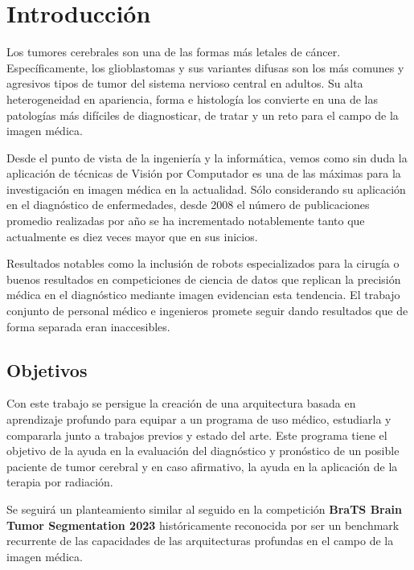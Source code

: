 \chapter{Introducción}

Los tumores cerebrales son una de las formas más letales de cáncer. Específicamente, los glioblastomas y sus variantes difusas son los más comunes y agresivos tipos de tumor del sistema nervioso central en adultos. Su alta heterogeneidad en apariencia, forma e histología los convierte en una de las patologías más difíciles de diagnosticar, de tratar y un reto para el campo de la imagen médica.

Desde el punto de vista de la ingeniería y la informática, vemos como sin duda la aplicación de técnicas de Visión por Computador es una de las máximas para la investigación en imagen médica en la actualidad. Sólo considerando su aplicación en el diagnóstico de enfermedades, desde 2008 el número de publicaciones promedio realizadas por año se ha incrementado notablemente tanto que actualmente es diez veces mayor que en sus inicios. 

Resultados notables como la inclusión de robots especializados para la cirugía \cite{cheng2022vinci} o buenos resultados en competiciones de ciencia de datos que replican la precisión médica en el diagnóstico mediante imagen \cite{bulten2022artificial} evidencian esta tendencia. El trabajo conjunto de personal médico e ingenieros promete seguir dando resultados que de forma separada eran inaccesibles.



\section{Objetivos}


Con este trabajo se persigue la creación de una arquitectura basada en aprendizaje profundo para equipar a un programa de uso médico, estudiarla y compararla junto a trabajos previos y estado del arte. Este programa tiene el objetivo de la ayuda en la evaluación del diagnóstico y pronóstico de un posible paciente de tumor cerebral y en caso afirmativo, la ayuda en la aplicación de la terapia por radiación. 

Se seguirá un planteamiento similar al seguido en la competición \textbf{BraTS Brain Tumor Segmentation 2023} \cite{baid2021rsna} históricamente reconocida por ser un benchmark recurrente de las capacidades de las arquitecturas profundas en el campo de la imagen médica.

